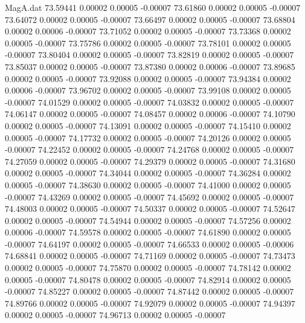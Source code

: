 \begin{filecontents}{MagA.dat}
  73.59441    0.00002    0.00005   -0.00007
  73.61860    0.00002    0.00005   -0.00007
  73.64072    0.00002    0.00005   -0.00007
  73.66497    0.00002    0.00005   -0.00007
  73.68804    0.00002    0.00006   -0.00007
  73.71052    0.00002    0.00005   -0.00007
  73.73368    0.00002    0.00005   -0.00007
  73.75786    0.00002    0.00005   -0.00007
  73.78101    0.00002    0.00005   -0.00007
  73.80404    0.00002    0.00005   -0.00007
  73.82819    0.00002    0.00005   -0.00007
  73.85037    0.00002    0.00005   -0.00007
  73.87380    0.00002    0.00006   -0.00007
  73.89685    0.00002    0.00005   -0.00007
  73.92088    0.00002    0.00005   -0.00007
  73.94384    0.00002    0.00006   -0.00007
  73.96702    0.00002    0.00005   -0.00007
  73.99108    0.00002    0.00005   -0.00007
  74.01529    0.00002    0.00005   -0.00007
  74.03832    0.00002    0.00005   -0.00007
  74.06147    0.00002    0.00005   -0.00007
  74.08457    0.00002    0.00006   -0.00007
  74.10790    0.00002    0.00005   -0.00007
  74.13091    0.00002    0.00005   -0.00007
  74.15410    0.00002    0.00005   -0.00007
  74.17732    0.00002    0.00005   -0.00007
  74.20126    0.00002    0.00005   -0.00007
  74.22452    0.00002    0.00005   -0.00007
  74.24768    0.00002    0.00005   -0.00007
  74.27059    0.00002    0.00005   -0.00007
  74.29379    0.00002    0.00005   -0.00007
  74.31680    0.00002    0.00005   -0.00007
  74.34044    0.00002    0.00005   -0.00007
  74.36284    0.00002    0.00005   -0.00007
  74.38630    0.00002    0.00005   -0.00007
  74.41000    0.00002    0.00005   -0.00007
  74.43269    0.00002    0.00005   -0.00007
  74.45692    0.00002    0.00005   -0.00007
  74.48003    0.00002    0.00005   -0.00007
  74.50337    0.00002    0.00005   -0.00007
  74.52647    0.00002    0.00005   -0.00007
  74.54944    0.00002    0.00005   -0.00007
  74.57256    0.00002    0.00006   -0.00007
  74.59578    0.00002    0.00005   -0.00007
  74.61890    0.00002    0.00005   -0.00007
  74.64197    0.00002    0.00005   -0.00007
  74.66533    0.00002    0.00005   -0.00006
  74.68841    0.00002    0.00005   -0.00007
  74.71169    0.00002    0.00005   -0.00007
  74.73473    0.00002    0.00005   -0.00007
  74.75870    0.00002    0.00005   -0.00007
  74.78142    0.00002    0.00005   -0.00007
  74.80478    0.00002    0.00005   -0.00007
  74.82914    0.00002    0.00005   -0.00007
  74.85227    0.00002    0.00005   -0.00007
  74.87442    0.00002    0.00005   -0.00007
  74.89766    0.00002    0.00005   -0.00007
  74.92079    0.00002    0.00005   -0.00007
  74.94397    0.00002    0.00005   -0.00007
  74.96713    0.00002    0.00005   -0.00007

\end{filecontents}
